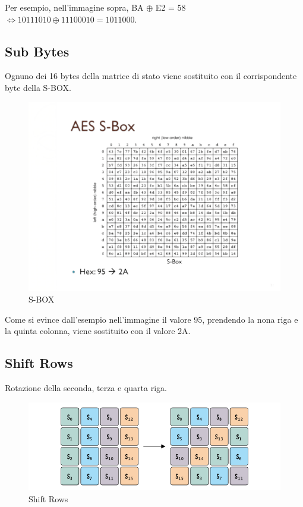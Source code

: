 \textsf{\small Per esempio, nell'immagine sopra, BA $ \oplus $ E2 = 58 $ \Leftrightarrow 10111010 \oplus 11100010 = 1011000 $.}

\subsection{Sub Bytes}


\textsf{\small Ognuno dei 16 bytes della matrice di stato viene sostituito con il corrispondente byte della S-BOX.}

\begin{figure}[H]
	\centering
	\includegraphics[width=.9\textwidth, height=.9\textheight, keepaspectratio]{./images/aes/aes-s-box-no-background.png}
	\caption{S-BOX}
	\label{fig:sbox}
\end{figure}

\textsf{\small Come si evince dall'esempio nell'immagine il valore 95, prendendo la nona riga e la quinta colonna, viene sostituito con il valore 2A.}

\subsection{Shift Rows}


\textsf{\small Rotazione della seconda, terza e quarta riga.}

\begin{figure}[H]
	\centering
	\includegraphics[width=.9\textwidth, height=.9\textheight, keepaspectratio]{./images/aes/aes-shift-rows.png}
	\caption{Shift Rows}
	\label{fig:shift_rows2}
\end{figure}

